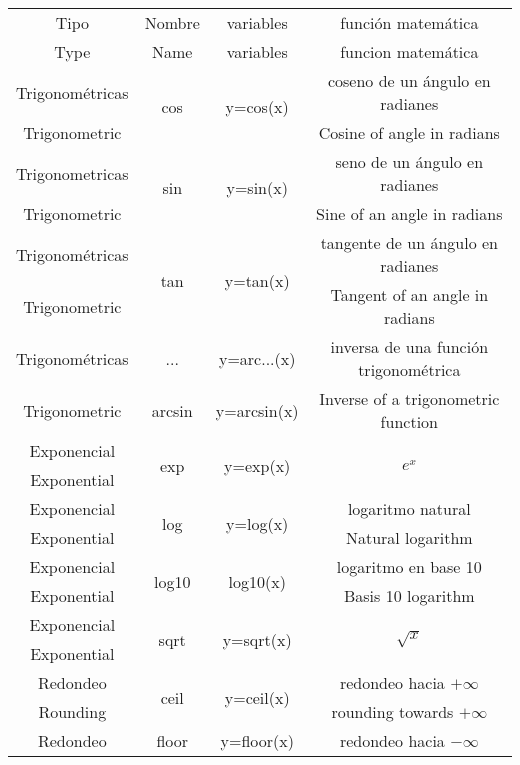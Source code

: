 \begin{table}[h]
 \label{tabfun}

\begin{tabular}{c|c|c|c}
Tipo&Nombre&variables&función matemática\\
Type&Name&variables&funcion matemática\\
\hline
\hline

Trigonométricas&\multirow{2}{*}{cos}&\multirow{2}{4em}{y=cos(x)}&coseno de un ángulo en radianes\\
Trigonometric& & & Cosine of angle in radians\\
\hline
Trigonometricas&\multirow{2}{*}{sin}&\multirow{2}{4em}{y=sin(x)}&seno de un ángulo en radianes\\
Trigonometric& & &Sine of an angle in radians\\
\hline
Trigonométricas&\multirow{2}{*}{tan}&\multirow{2}{4em}{y=tan(x)}&tangente de un ángulo en radianes\\
Trigonometric & & &Tangent of an angle in radians\\
\hline
Trigonométricas &...&y=arc...(x)&inversa de una función trigonométrica\\
Trigonometric &arcsin&y=arcsin(x)& Inverse of a trigonometric function\\
\hline
\hline
Exponencial&\multirow{2}{*}{exp}&\multirow{2}{*}{y=exp(x)}&\multirow{2}{*}{$e^x$}\\
Exponential& & & \\
\hline
Exponencial&\multirow{2}{*}{log}&\multirow{2}{*}{y=log(x)}&logaritmo natural\\
Exponential & & & Natural logarithm\\
\hline
Exponencial&\multirow{2}{*}{log10}&\multirow{2}{*}{log10(x)}&logaritmo en base 10\\
Exponential& & & Basis 10 logarithm\\
\hline
Exponencial&\multirow{2}{*}{sqrt}&\multirow{2}{*}{y=sqrt(x)}&\multirow{2}{*}{$\sqrt{x}$}\\
Exponential& & & \\
\hline
\hline
Redondeo&\multirow{2}{*}{ceil}&\multirow{2}{*}{y=ceil(x)}& redondeo hacia $+\infty$\\
Rounding& & & rounding towards $+\infty$\\
\hline
Redondeo&\multirow{2}{*}{floor}&\multirow{2}{*}{y=floor(x)}&redondeo hacia $-\infty$\\

\end{tabular}
\end{table}
